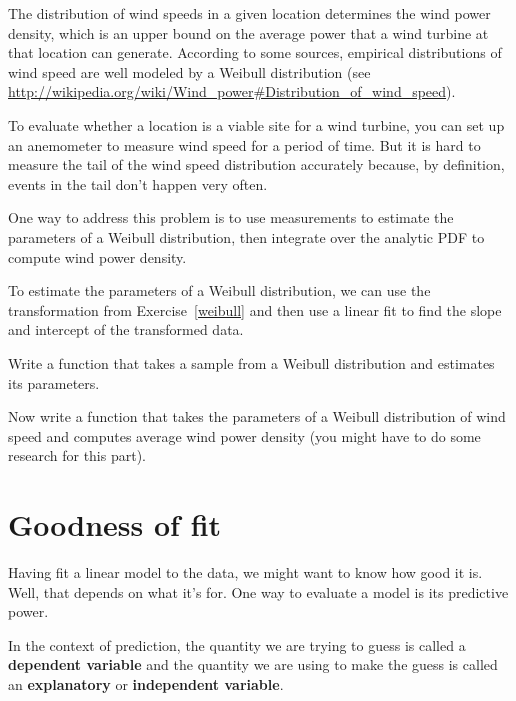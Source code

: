 \documentclass[12pt]{book}
\begin{document}
\begin{exercise}
The distribution of wind speeds in a given location determines the
wind power density, which is an upper bound on the average power that
a wind turbine at that location can generate.  According to some
sources, empirical distributions of wind speed are well modeled by a
Weibull distribution (see
\url{http://wikipedia.org/wiki/Wind_power#Distribution_of_wind_speed}).

To evaluate whether a location is a viable site for a wind turbine,
you can set up an anemometer to measure wind speed for a period of
time.  But it is hard to measure the tail of the wind speed distribution
accurately because, by definition, events in the tail don't happen
very often.

One way to address this problem is to use measurements to estimate the
parameters of a Weibull distribution, then integrate over the
analytic PDF to compute wind power density.

To estimate the parameters of a Weibull distribution, we can use the
transformation from Exercise~\ref{weibull} and then use a linear fit
to find the slope and intercept of the transformed data.

Write a function that takes a sample from a Weibull distribution and
estimates its parameters.

Now write a function that takes the parameters of a Weibull distribution
of wind speed and computes average wind power density (you might have
to do some research for this part).

\end{exercise}


\section{Goodness of fit}

Having fit a linear model to the data, we might want to know how good
it is.  Well, that depends on what it's for.  One way to evaluate a
model is its predictive power.

In the context of prediction, the quantity we are trying to guess is
called a {\bf dependent variable} and the quantity we are using to
make the guess is called an {\bf explanatory} or {\bf independent
  variable}.
\end{document}
